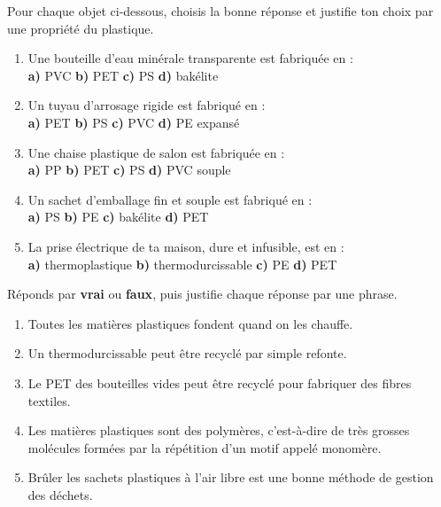 \documentclass[11pt]{article}
\begin{document}
\begin{exercice}
Pour chaque objet ci-dessous, choisis la bonne réponse et justifie ton choix par une propriété du plastique.
\begin{enumerate}
\item Une bouteille d'eau minérale transparente est fabriquée en : \\
\textbf{a)} PVC \quad \textbf{b)} PET \quad \textbf{c)} PS \quad \textbf{d)} bakélite
\item Un tuyau d'arrosage rigide est fabriqué en : \\
\textbf{a)} PET \quad \textbf{b)} PS \quad \textbf{c)} PVC \quad \textbf{d)} PE expansé
\item Une chaise plastique de salon est fabriquée en : \\
\textbf{a)} PP \quad \textbf{b)} PET \quad \textbf{c)} PS \quad \textbf{d)} PVC souple
\item Un sachet d'emballage fin et souple est fabriqué en : \\
\textbf{a)} PS \quad \textbf{b)} PE \quad \textbf{c)} bakélite \quad \textbf{d)} PET
\item La prise électrique de ta maison, dure et infusible, est en : \\
\textbf{a)} thermoplastique \quad \textbf{b)} thermodurcissable \quad \textbf{c)} PE \quad \textbf{d)} PET
\end{enumerate}
\end{exercice}

\begin{exercice}
Réponds par \textbf{vrai} ou \textbf{faux}, puis justifie chaque réponse par une phrase.
\begin{enumerate}
\item Toutes les matières plastiques fondent quand on les chauffe.
\item Un thermodurcissable peut être recyclé par simple refonte.
\item Le PET des bouteilles vides peut être recyclé pour fabriquer des fibres textiles.
\item Les matières plastiques sont des polymères, c'est-à-dire de très grosses molécules formées par la répétition d'un motif appelé monomère.
\item Brûler les sachets plastiques à l'air libre est une bonne méthode de gestion des déchets.
\end{enumerate}
\end{exercice}
\end{document}
